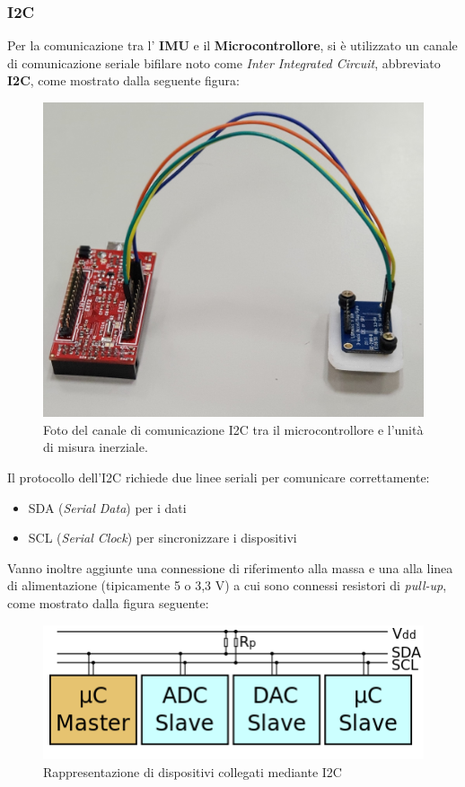 \subsubsection{I2C}
\label{imp_i2c}
Per la comunicazione tra l' \textbf{IMU} e il \textbf{Microcontrollore}, si è utilizzato un canale di comunicazione seriale bifilare noto come \textit{Inter Integrated Circuit}, abbreviato \textbf{I2C}, come mostrato dalla seguente figura:
\begin{figure}[H]  
	\centering 
	\includegraphics[scale=0.1]{implementazione/i2cFoto.jpg}
	\caption{Foto del canale di comunicazione I2C tra il microcontrollore e l'unità di misura inerziale.}
	\label{fig:i2cFoto}
\end{figure}
Il protocollo \cite{i2cWiki} dell'I2C richiede due linee seriali per comunicare correttamente:
\begin{itemize}
	\item SDA (\textit{Serial Data}) per i dati
	\item SCL (\textit{Serial Clock}) per sincronizzare i dispositivi
\end{itemize}
Vanno inoltre aggiunte una connessione di riferimento alla massa e una alla linea di alimentazione (tipicamente 5 o 3,3 V) a cui sono connessi resistori di \textit{pull-up}, come mostrato dalla figura seguente:
\begin{figure}[H]  
	\centering 
	\includegraphics[scale=0.6]{implementazione/i2c.png}
	\caption{Rappresentazione di dispositivi collegati mediante I2C}
	\label{fig:i2c}
\end{figure}
